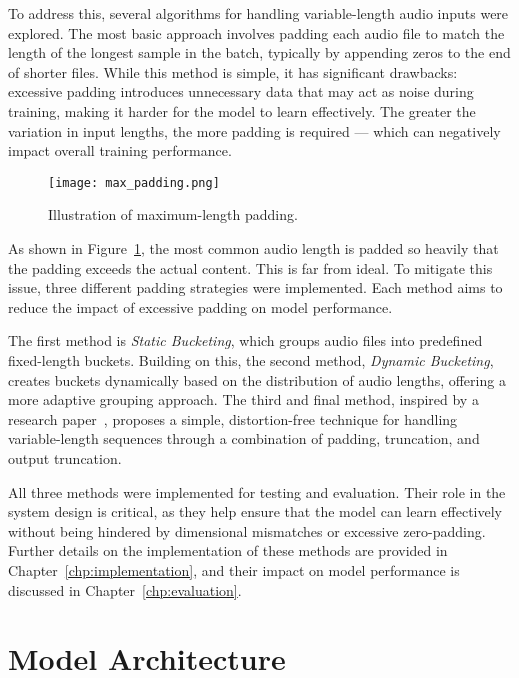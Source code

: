 To address this, several algorithms for handling variable-length audio inputs were explored. The most basic approach involves padding each audio file to match the length of the longest sample in the batch, typically by appending zeros to the end of shorter files. While this method is simple, it has significant drawbacks: excessive padding introduces unnecessary data that may act as noise during training, making it harder for the model to learn effectively. The greater the variation in input lengths, the more padding is required — which can negatively impact overall training performance.

\begin{figure}[h]
    \centering
    \texttt{[image: max\_padding.png]}
    \caption{\label{fig:max_padding}Illustration of maximum-length padding.}
\end{figure}

As shown in Figure~\ref{fig:max_padding}, the most common audio length is padded so heavily that the padding exceeds the actual content. This is far from ideal. To mitigate this issue, three different padding strategies were implemented. Each method aims to reduce the impact of excessive padding on model performance.

The first method is \textit{Static Bucketing}, which groups audio files into predefined fixed-length buckets. Building on this, the second method, \textit{Dynamic Bucketing}, creates buckets dynamically based on the distribution of audio lengths, offering a more adaptive grouping approach. The third and final method, inspired by a research paper~\cite{yoon2020pto}, proposes a simple, distortion-free technique for handling variable-length sequences through a combination of padding, truncation, and output truncation.

All three methods were implemented for testing and evaluation. Their role in the system design is critical, as they help ensure that the model can learn effectively without being hindered by dimensional mismatches or excessive zero-padding. Further details on the implementation of these methods are provided in Chapter~\ref{chp:implementation}, and their impact on model performance is discussed in Chapter~\ref{chp:evaluation}.

\section{Model Architecture}
\label{sec:model_architecture}

